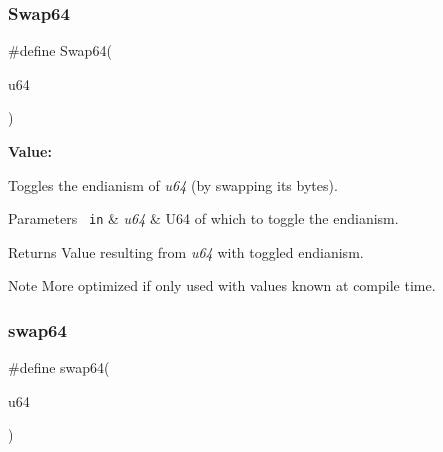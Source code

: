 \subsubsection{\texorpdfstring{Swap64}{Swap64}}
{\footnotesize\ttfamily \#define Swap64(\begin{DoxyParamCaption}\item[{}]{u64 }\end{DoxyParamCaption})}

{\bfseries Value\+:}
\begin{DoxyCode}{0}

\end{DoxyCode}


Toggles the endianism of {\itshape u64} (by swapping its bytes). 


\begin{DoxyParams}[1]{Parameters}
\mbox{\texttt{ in}}  & {\em u64} & U64 of which to toggle the endianism.\\
\hline
\end{DoxyParams}
\begin{DoxyReturn}{Returns}
Value resulting from {\itshape u64} with toggled endianism.
\end{DoxyReturn}
\begin{DoxyNote}{Note}
More optimized if only used with values known at compile time. 
\end{DoxyNote}
\mbox{\label{group__group__sam0__utils_ga78484801bd5bea7d382b34a4ed1f345d}} 
\subsubsection{\texorpdfstring{swap64}{swap64}}
{\footnotesize\ttfamily \#define swap64(\begin{DoxyParamCaption}\item[{}]{u64 }\end{DoxyParamCaption})}

